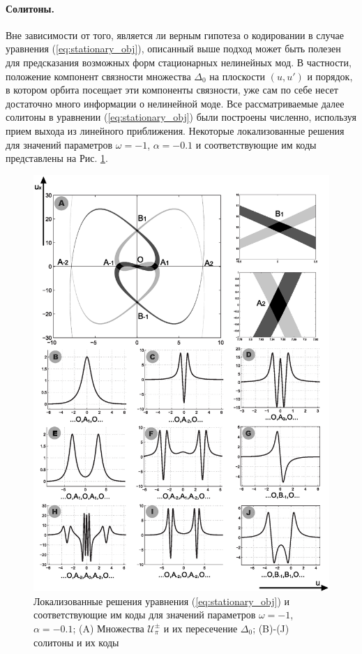 \paragraph{Солитоны.}
Вне зависимости от того, является ли верным гипотеза о кодировании в случае уравнения (\ref{eq:stationary_obj}), описанный выше подход может быть полезен для предсказания возможных форм стационарных нелинейных мод.
В частности, положение компонент связности множества $\Delta_0$ на плоскости $(u,u')$ и порядок, в котором орбита посещает эти компоненты связности, уже сам по себе несет достаточно много информации о нелинейной моде.
Все рассматриваемые далее солитоны в уравнении (\ref{eq:stationary_obj}) были построены численно, используя прием выхода из линейного приближения.
Некоторые локализованные решения для значений параметров $\omega = -1$, $\alpha = -0.1$ и соответствующие им коды представлены на Рис. \ref{pic:coding}.
%
\begin{figure}
\includegraphics[width=0.92\linewidth]{pic/coding.eps}
\caption{Локализованные решения уравнения (\ref{eq:stationary_obj}) и соответствующие им коды для значений параметров $\omega = -1$, $\alpha = -0.1$; (A) Множества $\mathcal{U}_{\pi}^{\pm}$ и их пересечение $\Delta_0$; (B)-(J) солитоны и их коды}
\label{pic:coding}
\end{figure}
%

